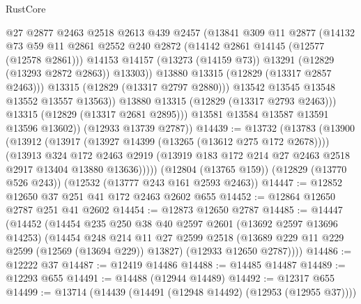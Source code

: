 \begin{lexlean}{RustCore}
\begin{coremodule}
                      @27
                      @2877
                      @2463
                      @2518
                      @2613
                      @439
                      @2457
                      (@13841
                        @309
                        @11
                        @2877
                        (@14132
                          @73
                          @59
                          @11
                          @2861
                          @2552
                          @240
                          @2872
                          (@14142 @2861 @14145 (@12577 (@12578 @2861)))
                          @14153
                          @14157
                          (@13273 (@14159 @73))
                          @13291
                          (@12829 (@13293 @2872 @2863))
                          @13303))
                      @13880
                      @13315
                      (@12829 (@13317 @2857 @2463)))
                    @13315
                    (@12829 (@13317 @2797 @2880)))
                  @13542
                  @13545
                  @13548
                  @13552
                  @13557
                  @13563))
              @13880
              @13315
              (@12829 (@13317 @2793 @2463)))
            @13315
            (@12829 (@13317 @2681 @2895)))
          @13581
          @13584
          @13587
          @13591
          @13596
          @13602))
      (@12933 @13739 @2787))
@14439 := @13732
    (@13783
      (@13900
        (@13912
          (@13917 (@13927 @14399 (@13265 (@13612 @275 @172 @2678))))
          (@13913
            @324
            @172
            @2463
            @2919
            (@13919 @183 @172 @214 @27 @2463 @2518 @2917 @13404 @13880 @13636)))))
    (@12804 (@13765 @159))
    (@12829 (@13770 @526 @243))
    (@12532 (@13777 @243 @161 @2593 @2463))
@14447 := @12852 @12650 @37 @251 @41 @172 @2463 @2602 @655
@14452 := @12864 @12650 @2787 @251 @41 @2602
@14454 := @12873 @12650 @2787
@14485 := @14447
    (@14452
      (@14454
        @235
        @250
        @38
        @40
        @2597
        @2601
        (@13692 @2597 @13696 @14253)
        (@14454
          @248
          @214
          @11
          @27
          @2599
          @2518
          (@13689 @229 @11 @229 @2599 (@12569 (@13694 @229)) @13827)
          (@12933 @12650 @2787))))
@14486 := @12222 @37
@14487 := @12419 @14486
@14488 := @14485 @14487
@14489 := @12293 @655
@14491 := @14488 (@12944 @14489)
@14492 := @12317 @655
@14499 := @13714 (@14439 (@14491 (@12948 @14492) (@12953 (@12955 @37))))

\end{coremodule}
\end{lexlean}
